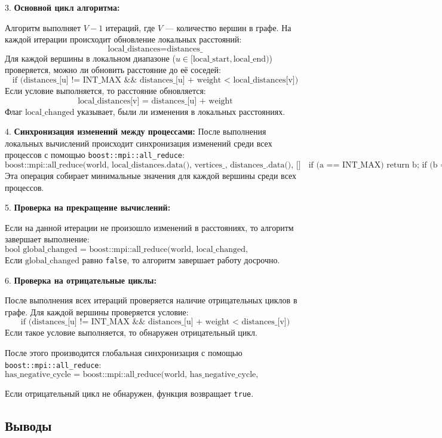 \documentclass[12pt]{article}
\begin{document}
3. \textbf{Основной цикл алгоритма:}

   Алгоритм выполняет \(V-1\) итераций, где \(V\) — количество вершин в графе. На каждой итерации происходит обновление локальных расстояний:
   \[
   \text{local\_distances} = \text{distances\_}
   \]
   Для каждой вершины в локальном диапазоне (\(u \in [\text{local\_start}, \text{local\_end})\)) проверяется, можно ли обновить расстояние до её соседей:
   \[
   \text{if (distances\_[u] != INT\_MAX && distances\_[u] + weight < local\_distances[v])}
   \]
   Если условие выполняется, то расстояние обновляется:
   \[
   \text{local\_distances[v] = distances\_[u] + weight}
   \]
   Флаг \(\text{local\_changed}\) указывает, были ли изменения в локальных расстояниях.

4. \textbf{Синхронизация изменений между процессами:}
   После выполнения локальных вычислений происходит синхронизация изменений среди всех процессов с помощью \texttt{boost::mpi::all\_reduce}:
   \[
   \text{boost::mpi::all\_reduce(world, local\_distances.data(), vertices\_, distances\_.data(), [](int a, int b) { if (a == INT\_MAX) return b; if (b == INT\_MAX) return a; return std::min(a, b); })}
   \]
   Эта операция собирает минимальные значения для каждой вершины среди всех процессов.
   
5. \textbf{Проверка на прекращение вычислений:}

   Если на данной итерации не произошло изменений в расстояниях, то алгоритм завершает выполнение:
   \[
   \text{bool global\_changed = boost::mpi::all\_reduce(world, local\_changed, std::logical\_or<>())}
   \]
   Если \(\text{global\_changed}\) равно \texttt{false}, то алгоритм завершает работу досрочно.

6. \textbf{Проверка на отрицательные циклы:}

   После выполнения всех итераций проверяется наличие отрицательных циклов в графе. Для каждой вершины проверяется условие:
   \[
   \text{if (distances\_[u] != INT\_MAX && distances\_[u] + weight < distances\_[v])}
   \]
   Если такое условие выполняется, то обнаружен отрицательный цикл.

   После этого производится глобальная синхронизация с помощью \texttt{boost::mpi::all\_reduce}:
   \[
   \text{has\_negative\_cycle = boost::mpi::all\_reduce(world, has\_negative\_cycle, std::logical\_or<>())}
   \]

   Если отрицательный цикл не обнаружен, функция возвращает \texttt{true}.
\subsection{Выводы}
\end{document}
